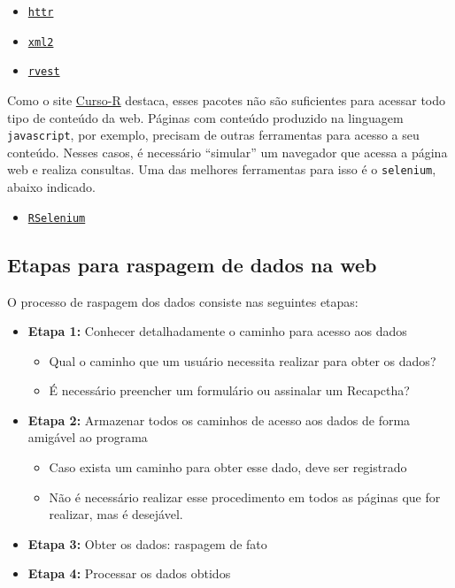 \documentclass[]{book}
\providecommand{\tightlist}{%
  \setlength{\itemsep}{0pt}\setlength{\parskip}{0pt}}
\begin{document}
\begin{itemize}
\tightlist
\item
  \href{https://cran.r-project.org/web/packages/httr/vignettes/quickstart.html}{\texttt{httr}}
\item
  \href{https://cran.r-project.org/web/packages/xml2/xml2.pdf}{\texttt{xml2}}
\item
  \href{https://blog.rstudio.com/2014/11/24/rvest-easy-web-scraping-with-r/}{\texttt{rvest}}
\end{itemize}

Como o site \href{http://material.curso-r.com/scrape/}{Curso-R} destaca, esses pacotes
não são suficientes para acessar todo tipo de conteúdo da web. Páginas com conteúdo
produzido na linguagem \texttt{javascript}, por exemplo, precisam de outras ferramentas para
acesso a seu conteúdo. Nesses casos, é necessário ``simular'' um navegador que acessa
a página web e realiza consultas. Uma das melhores ferramentas para isso é o
\texttt{selenium}, abaixo indicado.

\begin{itemize}
\tightlist
\item
  \href{https://ropensci.org/tutorials/rselenium_tutorial/}{\texttt{RSelenium}}
\end{itemize}

\hypertarget{etapas-para-raspagem-de-dados-na-web}{%
\subsection{Etapas para raspagem de dados na web}\label{etapas-para-raspagem-de-dados-na-web}}

O processo de raspagem dos dados consiste nas seguintes etapas:

\begin{itemize}
\item
  \textbf{Etapa 1:} Conhecer detalhadamente o caminho para acesso aos dados

  \begin{itemize}
  \tightlist
  \item
    Qual o caminho que um usuário necessita realizar para obter os dados?
  \item
    É necessário preencher um formulário ou assinalar um Recapctha?
  \end{itemize}
\item
  \textbf{Etapa 2:} Armazenar todos os caminhos de acesso aos dados de forma amigável ao programa

  \begin{itemize}
  \tightlist
  \item
    Caso exista um caminho para obter esse dado, deve ser registrado
  \item
    Não é necessário realizar esse procedimento em todos as páginas que for realizar, mas é desejável.
  \end{itemize}
\item
  \textbf{Etapa 3:} Obter os dados: raspagem de fato
\item
  \textbf{Etapa 4:} Processar os dados obtidos
\end{itemize}
\end{document}

